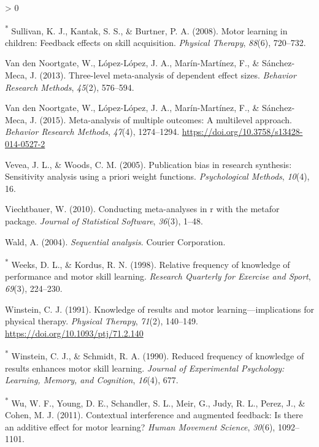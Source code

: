 \documentclass[
  english,
  man, donotrepeattitle,mask,floatsintext]{apa7}
\newlength{\cslhangindent}
\newenvironment{CSLReferences}[2] %
 {%
  \setlength{\parindent}{0pt}
  \ifodd #1 \everypar{\setlength{\hangindent}{\cslhangindent}}\ignorespaces\fi
  \ifnum #2 > 0
  \setlength{\parskip}{#2\baselineskip}
  \fi
 }%
 {}
\begin{document}
\begin{CSLReferences}{1}{0}
\leavevmode\hypertarget{ref-Sullivan2008}{}%
\textsuperscript{*} Sullivan, K. J., Kantak, S. S., \& Burtner, P. A. (2008). Motor learning in children: Feedback effects on skill acquisition. \emph{Physical Therapy}, \emph{88}(6), 720--732.

\leavevmode\hypertarget{ref-VandenNoortgate2013}{}%
Van den Noortgate, W., López-López, J. A., Marín-Martínez, F., \& Sánchez-Meca, J. (2013). Three-level meta-analysis of dependent effect sizes. \emph{Behavior Research Methods}, \emph{45}(2), 576--594.

\leavevmode\hypertarget{ref-VandenNoortgate2015}{}%
Van den Noortgate, W., López-López, J. A., Marín-Martínez, F., \& Sánchez-Meca, J. (2015). Meta-analysis of multiple outcomes: A multilevel approach. \emph{Behavior Research Methods}, \emph{47}(4), 1274--1294. \url{https://doi.org/10.3758/s13428-014-0527-2}

\leavevmode\hypertarget{ref-Vevea2005}{}%
Vevea, J. L., \& Woods, C. M. (2005). Publication bias in research synthesis: Sensitivity analysis using a priori weight functions. \emph{Psychological Methods}, \emph{10}(4), 16.

\leavevmode\hypertarget{ref-Viechtbauer2010}{}%
Viechtbauer, W. (2010). Conducting meta-analyses in r with the metafor package. \emph{Journal of Statistical Software}, \emph{36}(3), 1--48.

\leavevmode\hypertarget{ref-Wald2004}{}%
Wald, A. (2004). \emph{Sequential analysis}. Courier Corporation.

\leavevmode\hypertarget{ref-Weeks1998}{}%
\textsuperscript{*} Weeks, D. L., \& Kordus, R. N. (1998). Relative frequency of knowledge of performance and motor skill learning. \emph{Research Quarterly for Exercise and Sport}, \emph{69}(3), 224--230.

\leavevmode\hypertarget{ref-Winstein1991}{}%
Winstein, C. J. (1991). Knowledge of results and motor learning---implications for physical therapy. \emph{Physical Therapy}, \emph{71}(2), 140--149. \url{https://doi.org/10.1093/ptj/71.2.140}

\leavevmode\hypertarget{ref-Winstein1990}{}%
\textsuperscript{*} Winstein, C. J., \& Schmidt, R. A. (1990). Reduced frequency of knowledge of results enhances motor skill learning. \emph{Journal of Experimental Psychology: Learning, Memory, and Cognition}, \emph{16}(4), 677.

\leavevmode\hypertarget{ref-Wu2011}{}%
\textsuperscript{*} Wu, W. F., Young, D. E., Schandler, S. L., Meir, G., Judy, R. L., Perez, J., \& Cohen, M. J. (2011). Contextual interference and augmented feedback: Is there an additive effect for motor learning? \emph{Human Movement Science}, \emph{30}(6), 1092--1101.


\end{CSLReferences}
\end{document}

